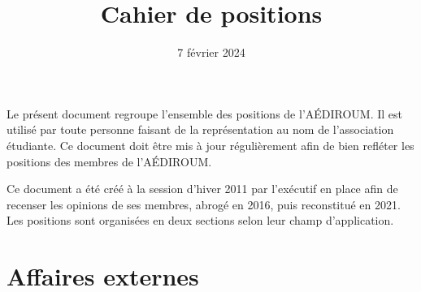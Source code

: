 \documentclass{aediroum}
\title{Cahier de positions}
\date{7 février 2024}
\begin{document}
\maketitle

Le présent document regroupe l'ensemble des positions de l'AÉDIROUM. Il est utilisé par toute personne faisant de la représentation au nom de l'association étudiante. Ce document doit être mis à jour régulièrement afin de bien refléter les positions des membres de l'AÉDIROUM.

Ce document a été créé à la session d'hiver 2011 par l'exécutif en place afin de recenser les opinions de ses membres, abrogé en 2016, puis reconstitué en 2021. Les positions sont organisées en deux sections selon leur champ d'application.

\section{Affaires externes}
\end{document}
